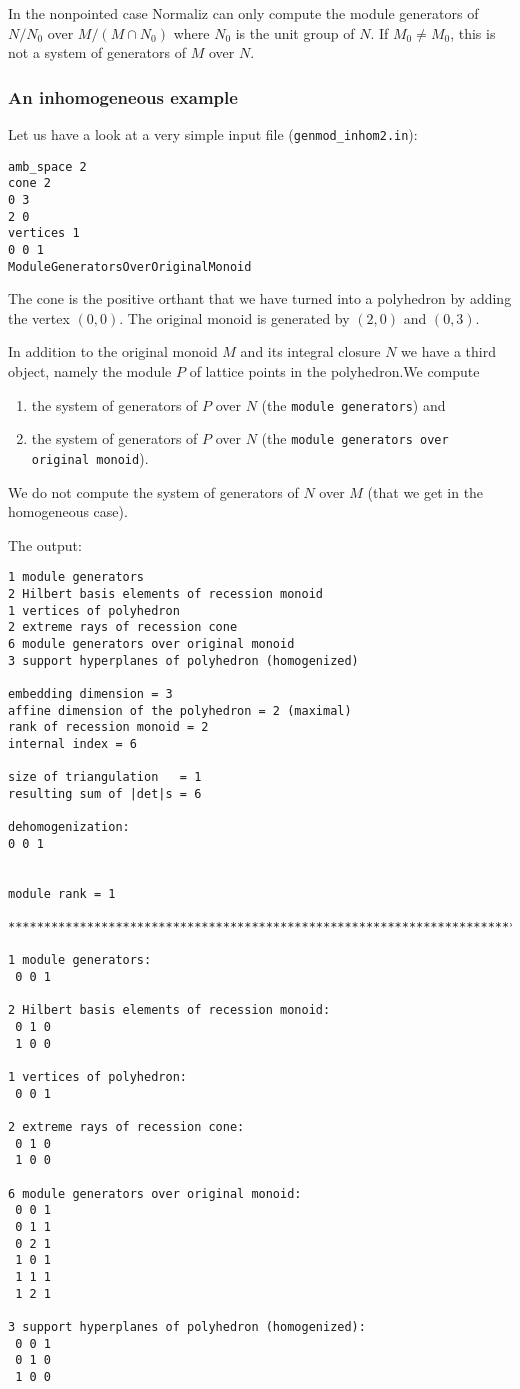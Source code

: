 \documentclass[12pt,a4paper]{scrartcl}
\theoremstyle{definition}
\begin{document}
In the nonpointed case Normaliz can only compute the module generators of $N/N_0$ over $M/(M\cap N_0)$ where $N_0$ is the unit group of $N$. If $M_0\neq M_0$, this is not a system of generators of $M$ over $N$.

\subsubsection{An inhomogeneous example}

Let us have a look at a very simple input file (\verb|genmod_inhom2.in|):
\begin{Verbatim}
amb_space 2
cone 2
0 3
2 0
vertices 1
0 0 1
ModuleGeneratorsOverOriginalMonoid
\end{Verbatim}

The cone is the positive orthant that we have turned into a polyhedron by adding the vertex $(0,0)$. The original monoid is generated by $(2,0)$ and $(0,3)$.

In addition to the original monoid $M$ and its integral closure $N$ we have a third object, namely the module $P$ of lattice points in the polyhedron.We compute
\begin{enumerate}
	\item the system of generators of $P$ over $N$ (the \verb|module generators|) and
	\item the system of generators of $P$ over $N$ (the \verb|module generators over original monoid|).
\end{enumerate}
We do not compute the system of generators of $N$ over $M$ (that we get in the homogeneous case).

The output:
\begin{Verbatim}
1 module generators
2 Hilbert basis elements of recession monoid
1 vertices of polyhedron
2 extreme rays of recession cone
6 module generators over original monoid
3 support hyperplanes of polyhedron (homogenized)

embedding dimension = 3
affine dimension of the polyhedron = 2 (maximal)
rank of recession monoid = 2
internal index = 6

size of triangulation   = 1
resulting sum of |det|s = 6

dehomogenization:
0 0 1 


module rank = 1

***********************************************************************

1 module generators:
 0 0 1

2 Hilbert basis elements of recession monoid:
 0 1 0
 1 0 0

1 vertices of polyhedron:
 0 0 1

2 extreme rays of recession cone:
 0 1 0
 1 0 0

6 module generators over original monoid:
 0 0 1
 0 1 1
 0 2 1
 1 0 1
 1 1 1
 1 2 1

3 support hyperplanes of polyhedron (homogenized):
 0 0 1
 0 1 0
 1 0 0
\end{Verbatim}
\end{document}
